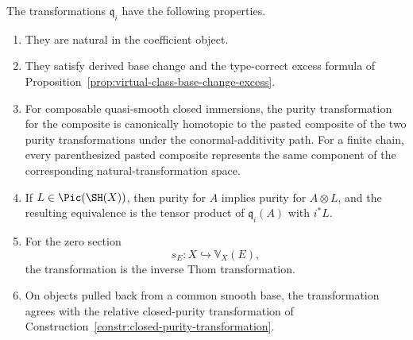 \begin{proposition}
\label{prop:closed-purity-formal-properties}
The transformations \(\mathfrak q_i\) have the following properties.
\begin{enumerate}
    \item They are natural in the coefficient object.

    \item They satisfy derived base change and the type-correct excess
    formula of
    Proposition~\ref{prop:virtual-class-base-change-excess}.

    \item For composable quasi-smooth closed immersions, the purity
    transformation for the composite is canonically homotopic to the pasted
    composite of the two purity transformations under the
    conormal-additivity path.  For a finite chain, every parenthesized pasted
    composite represents the same component of the corresponding
    natural-transformation space.

    \item If \(L\in\Pic(\SH(X))\), then purity for \(A\) implies purity
    for \(A\otimes L\), and the resulting equivalence is the tensor product
    of \(\mathfrak q_i(A)\) with \(i^*L\).

    \item For the zero section
    \[
        s_E:X\hookrightarrow\mathbb V_X(E),
    \]
    the transformation is the inverse Thom transformation.

    \item On objects pulled back from a common smooth base, the
    transformation agrees with the relative closed-purity transformation of
    Construction~\ref{constr:closed-purity-transformation}.
\end{enumerate}
\end{proposition}

